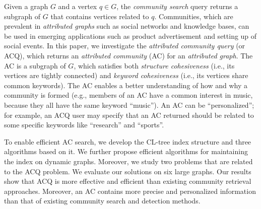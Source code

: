 Given a graph $G$ and a vertex $q \in G$, the {\it community search} query returns a subgraph of $G$ that contains vertices related to $q$. Communities, which are prevalent in {\it attributed graphs} such as social networks and knowledge bases, can be used in emerging applications such as product advertisement and setting up of social events.
In this paper, we investigate the {\it attributed community query} (or ACQ), which returns an {\it attributed community} (AC) for an {\it attributed graph}. The AC is a subgraph of $G$, which satisfies both {\it structure cohesiveness} (i.e., its vertices are tightly connected) and {\it keyword cohesiveness} (i.e., its vertices share common keywords).  The AC enables a better understanding of how and why a community is formed (e.g., members of an AC have a common interest in music, because they all have the same keyword ``music'').  An AC can be ``personalized''; for example, an ACQ user may specify that an AC returned should be related to some specific keywords like ``research'' and ``sports''.

To enable efficient AC search, we develop the CL-tree index structure and three algorithms based on it. We further propose efficient algorithms for maintaining the index on dynamic graphs. Moreover, we study two problems that are related to the ACQ problem. We evaluate our solutions on six large graphs. Our results show that ACQ is more effective and efficient than existing community retrieval approaches. Moreover, an AC contains more precise and personalized information than that of existing community search and detection methods. 
